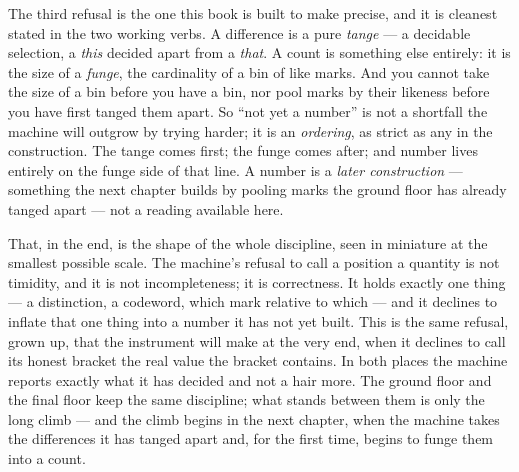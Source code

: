 The third refusal is the one this book is built to make precise, and it is cleanest stated in the two working verbs. A
difference is a pure \emph{tange} --- a decidable selection, a \emph{this} decided apart from a \emph{that}. A count is
something else entirely: it is the size of a \emph{funge}, the cardinality of a bin of like marks. And you cannot take
the size of a bin before you have a bin, nor pool marks by their likeness before you have first tanged them apart. So
``not yet a number'' is not a shortfall the machine will outgrow by trying harder; it is an \emph{ordering}, as strict
as any in the construction. The tange comes first; the funge comes after; and number lives entirely on the funge side
of that line. A number is a \emph{later construction} --- something the next chapter builds by pooling marks the ground
floor has already tanged apart --- not a reading available here.

That, in the end, is the shape of the whole discipline, seen in miniature at the smallest possible scale. The machine's
refusal to call a position a quantity is not timidity, and it is not incompleteness; it is correctness. It holds exactly
one thing --- a distinction, a codeword, which mark relative to which --- and it declines to inflate that one thing into
a number it has not yet built. This is the same refusal, grown up, that the instrument will make at the very end, when
it declines to call its honest bracket the real value the bracket contains. In both places the machine reports exactly
what it has decided and not a hair more. The ground floor and the final floor keep the same discipline; what stands
between them is only the long climb --- and the climb begins in the next chapter, when the machine takes the differences
it has tanged apart and, for the first time, begins to funge them into a count.
